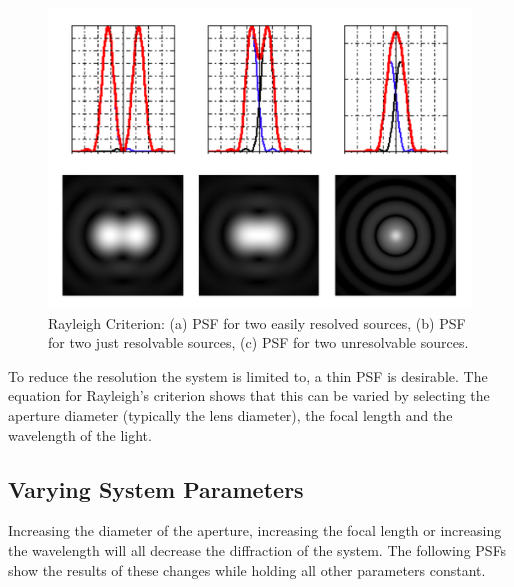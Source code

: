 \begin{figure}[H]
	\centering
		\includegraphics[width=1.0\textwidth]{figures/RayleighCriterion.png}
	\caption{Rayleigh Criterion: (a) PSF for two easily resolved sources, (b) PSF for two just resolvable sources, (c) PSF for two unresolvable sources. }
	\label{fig:Rayleigh}
\end{figure}


To reduce the resolution the system is limited to, a thin PSF is desirable.  The equation for Rayleigh's criterion shows that this can be varied by selecting the aperture diameter (typically the lens diameter), the focal length and the wavelength of the light.  

\subsection{Varying System Parameters}
Increasing the diameter of the aperture, increasing the focal length or increasing the wavelength will all decrease the diffraction of the system.  The following PSFs show the results of these changes while holding all other parameters constant.  

